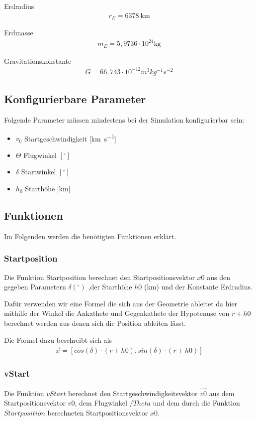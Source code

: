 \documentclass[]{scrartcl}
\begin{document}
Erdradius
\begin{align}
r_{E} = \SI{6378}{\km}
\end{align}

Erdmasse
\begin{align}
m_{E} = 5,9736 \cdot 10^{24} \si{\kg}
\end{align}

Gravitationskonstante
\begin{align}
G = 66,743 \cdot 10^{-12} m^{3} kg^{-1} s^{-2}
\end{align}

\subsection{Konfigurierbare Parameter}
Folgende Parameter müssen mindestens bei der Simulation konfigurierbar sein:
\begin{itemize}
\item $v_{0}$ Startgeschwindigkeit [\si[per-mode=fraction]{\km\per\second}]
\item $\Theta$ Flugwinkel $[^\circ]$
\item $\delta$ Startwinkel $[^\circ]$
\item $h_{0}$ Starthöhe [km]
\end{itemize}

\subsection{Funktionen}
Im Folgenden werden die benötigten Funktionen erklärt.

\subsubsection{Startposition}
Die Funktion Startposition berechnet den Startpositionsvektor $x0$ aus den gegeben Parametern $\delta (^\circ)$ ,der Starthöhe $h0$ (km) und der Konstante Erdradius.

Dafür verwenden wir eine Formel die sich aus der Geometrie ableitet da hier mithilfe der Winkel die Ankathete und Gegenkathete der Hypotenuse von $r + h0$ berechnet werden aus denen sich die Position ableiten lässt.

Die Formel dazu beschreibt sich als 
\begin{align}
\vec{x} = [cos(\delta) \cdot( r + h0), sin(\delta) \cdot (r + h0)]
\end{align}

\subsubsection{vStart}
Die Funktion $vStart$ berechnet den Startgeschwindigkeitsvektor $\vec{v0}$ aus dem Startpositionsvektor $v0$, dem Flugwinkel $/Theta$ und dem durch die Funktion $Startposition$ berechneten Startpositionsvektor $x0$.
\end{document}
